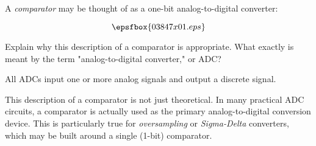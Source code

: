 

A {\it comparator} may be thought of as a one-bit analog-to-digital converter:

$$\epsfbox{03847x01.eps}$$

Explain why this description of a comparator is appropriate.  What exactly is meant by the term "analog-to-digital converter," or ADC?







All ADCs input one or more analog signals and output a discrete signal.







This description of a comparator is not just theoretical.  In many practical ADC circuits, a comparator is actually used as the primary analog-to-digital conversion device.  This is particularly true for {\it oversampling} or {\it Sigma-Delta} converters, which may be built around a single (1-bit) comparator.




